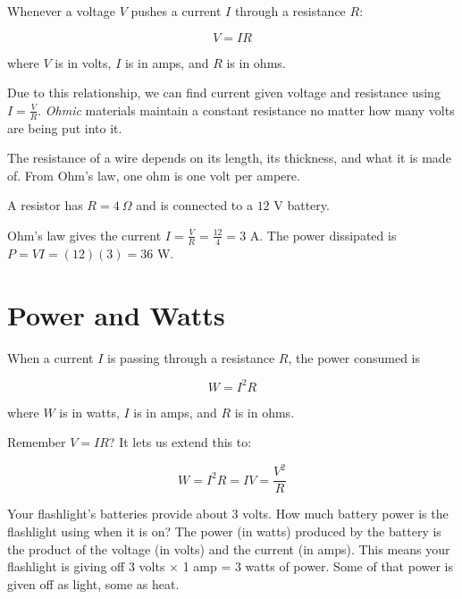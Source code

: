 \begin{mdframed}[style=important, frametitle={Ohm's Law}]
  Whenever a voltage $V$ pushes a current $I$ through a resistance $R$:

  $$V = IR$$

  where $V$ is in volts, $I$ is in amps, and $R$ is in ohms.
\end{mdframed}
Due to this relationship, we can find current given voltage and resistance using $I = \frac{V}{R}$. \textit{Ohmic} materials maintain a constant resistance no matter how many volts are being put into it.

The resistance of a wire depends on its length, its thickness, and what it is made of. From Ohm's law, one ohm is one volt per ampere.

\begin{Worked}
\begin{Problem}
A resistor has $R = 4\ \Omega$ and is connected to a $12$ V battery.
\end{Problem}
\begin{Solution}
Ohm's law gives the current $I = \frac{V}{R} = \frac{12}{4} = 3$ A. The power dissipated is $P = VI = (12)(3) = 36$ W.
\end{Solution}
\end{Worked}

\section{Power and Watts}

\begin{mdframed}[style=important, frametitle={Joule's Law}]

  When a current $I$ is passing through a resistance $R$, the power consumed is
  
  $$W = I^2 R$$

  where $W$ is in watts, $I$ is in amps, and $R$ is in ohms.
\end{mdframed}

Remember $V = IR$? It lets us extend this to:

$$W = I^2 R = I V = \frac{V^2}{R}$$

Your flashlight's batteries provide about 3 volts. How much
battery power is the flashlight using when it is on? The power (in
watts) produced by the battery is the product of the voltage (in
volts) and the current (in amps). This means your flashlight is giving off 3 volts $\times$ 1 amp = 3 watts of power. Some of that power is given
off as light, some as heat.

